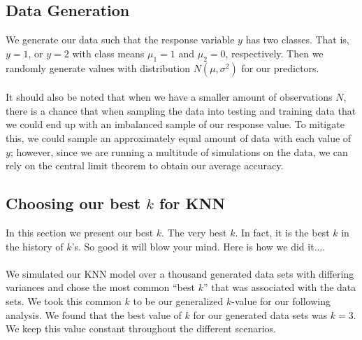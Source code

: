 \documentclass[11pt, oneside]{article}
\begin{document}
\subsection{Data Generation} 
We generate our data such that the response variable $y$ has two classes. That is, $y=1$, or $y=2$ with class means $\mu_1=1$ and $\mu_2=0$, respectively. Then we randomly generate values with distribution $N(\mu, \sigma^2)$ for our predictors.\\
\\
It should also be noted that when we have a smaller amount of observations $N$, there is a chance that when sampling the data into testing and training data that we could end up with an imbalanced sample of our response value. To mitigate this, we could sample an approximately equal amount of data with each value of $y$; however, since we are running a multitude of simulations on the data, we can rely on the central limit theorem to obtain our average accuracy.\\ 


\subsection{Choosing our best $k$ for KNN}
In this section we present our best $k$. The very best $k$. In fact, it is the best $k$ in the history of $k$'s. So good it will blow your mind. Here is how we did it....\\
\\
We simulated our KNN model over a thousand generated data sets with differing variances and chose the most common ``best $k$'' that was associated with the data sets. We took this common $k$ to be our generalized $k$-value for our following analysis. We found that the best value of $k$ for our generated data sets was $k = 3$. We keep this value constant throughout the different scenarios.\\
\end{document}

